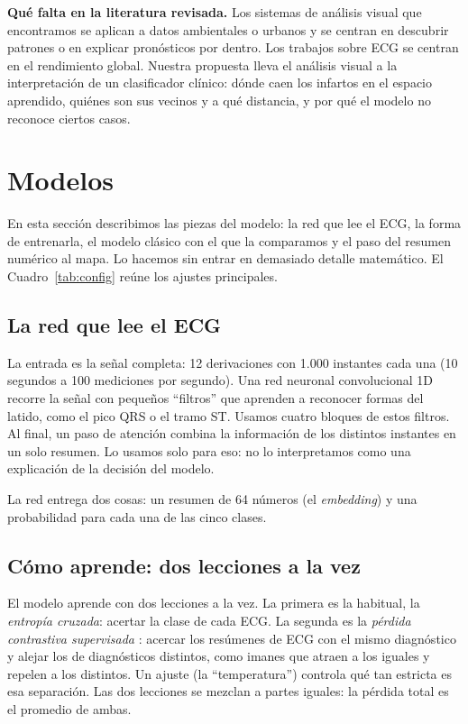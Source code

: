 \documentclass[conference]{IEEEtran}
\begin{document}
\textbf{Qué falta en la literatura revisada.} Los sistemas de análisis visual que encontramos se aplican a datos ambientales o urbanos y se centran en descubrir patrones o en explicar pronósticos por dentro. Los trabajos sobre ECG se centran en el rendimiento global. Nuestra propuesta lleva el análisis visual a la interpretación de un clasificador clínico: dónde caen los infartos en el espacio aprendido, quiénes son sus vecinos y a qué distancia, y por qué el modelo no reconoce ciertos casos.

\section{Modelos}
En esta sección describimos las piezas del modelo: la red que lee el ECG, la forma de entrenarla, el modelo clásico con el que la comparamos y el paso del resumen numérico al mapa. Lo hacemos sin entrar en demasiado detalle matemático. El Cuadro~\ref{tab:config} reúne los ajustes principales.

\subsection{La red que lee el ECG}
La entrada es la señal completa: 12 derivaciones con 1.000 instantes cada una (10 segundos a 100 mediciones por segundo). Una red neuronal convolucional 1D recorre la señal con pequeños ``filtros'' que aprenden a reconocer formas del latido, como el pico QRS o el tramo ST. Usamos cuatro bloques de estos filtros. Al final, un paso de atención combina la información de los distintos instantes en un solo resumen. Lo usamos solo para eso: no lo interpretamos como una explicación de la decisión del modelo.

La red entrega dos cosas: un resumen de 64 números (el \emph{embedding}) y una probabilidad para cada una de las cinco clases.

\subsection{Cómo aprende: dos lecciones a la vez}
El modelo aprende con dos lecciones a la vez. La primera es la habitual, la \emph{entropía cruzada}: acertar la clase de cada ECG. La segunda es la \emph{pérdida contrastiva supervisada} \cite{khosla}: acercar los resúmenes de ECG con el mismo diagnóstico y alejar los de diagnósticos distintos, como imanes que atraen a los iguales y repelen a los distintos. Un ajuste (la ``temperatura'') controla qué tan estricta es esa separación. Las dos lecciones se mezclan a partes iguales: la pérdida total es el promedio de ambas.
\end{document}
